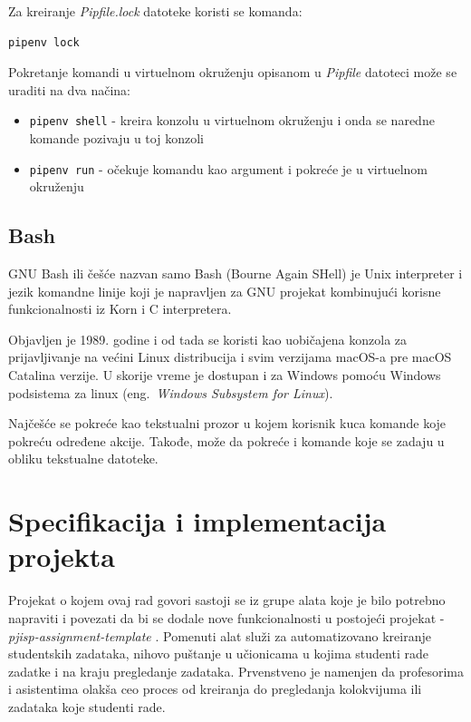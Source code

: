 \documentclass[12pt]{report}
\begin{document}
Za kreiranje \textit{Pipfile.lock} datoteke koristi se komanda:

\begin{verbatim}
pipenv lock
\end{verbatim}

Pokretanje komandi u virtuelnom okruženju opisanom u \textit{Pipfile} datoteci može se uraditi na dva načina:

\begin{itemize}
    \item \texttt{pipenv shell} - kreira konzolu u virtuelnom okruženju i onda se naredne komande pozivaju u toj konzoli
    \item \texttt{pipenv run} - očekuje komandu kao argument i pokreće je u virtuelnom okruženju
\end{itemize}

\section{Bash}

GNU Bash \cite{bash} ili češće nazvan samo Bash (Bourne Again SHell) je Unix interpreter i jezik komandne linije koji je napravljen za GNU projekat kombinujući korisne funkcionalnosti iz Korn i C interpretera.

Objavljen je 1989. godine i od tada se koristi kao uobičajena konzola za prijavljivanje na većini Linux distribucija i svim verzijama macOS-a pre macOS Catalina verzije. U skorije vreme je dostupan i za Windows pomoću Windows podsistema za linux (eng.\ \textit{Windows Subsystem for Linux}).

Najčešće se pokreće kao tekstualni prozor u kojem korisnik kuca komande koje pokreću određene akcije. Takođe, može da pokreće i komande koje se zadaju u obliku tekstualne datoteke.

\chapter{Specifikacija i implementacija projekta}

Projekat o kojem ovaj rad govori sastoji se iz grupe alata koje je bilo potrebno napraviti i povezati da bi se dodale nove funkcionalnosti u postojeći projekat - \textit{pjisp-assignment-template} \cite{pjisp-assignment-template}. Pomenuti alat služi za automatizovano kreiranje studentskih zadataka, nihovo puštanje u učionicama u kojima studenti rade zadatke i na kraju pregledanje zadataka. Prvenstveno je namenjen da profesorima i asistentima olakša ceo proces od kreiranja do pregledanja kolokvijuma ili zadataka koje studenti rade.
\end{document}
